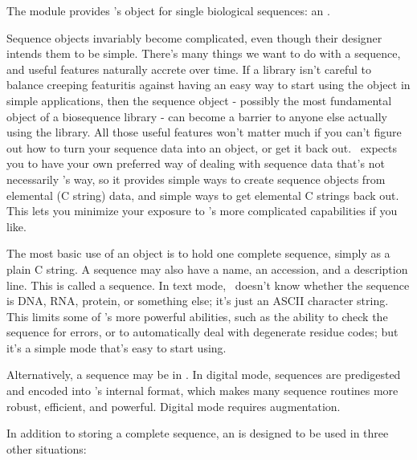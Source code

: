 The  module provides \Easel's object for single biological
sequences: an .

Sequence objects invariably become complicated, even though their
designer intends them to be simple. There's many things we want to do
with a sequence, and useful features naturally accrete over time. If a
library isn't careful to balance creeping featuritis against having an
easy way to start using the object in simple applications, then the
sequence object - possibly the most fundamental object of a
biosequence library - can become a barrier to anyone else actually
using the library. All those useful features won't matter much if you
can't figure out how to turn your sequence data into an object, or get
it back out. \Easel\ expects you to have your own preferred way of
dealing with sequence data that's not necessarily \Easel's way, so it
provides simple ways to create sequence objects from elemental (C
string) data, and simple ways to get elemental C strings back out.
This lets you minimize your exposure to \Easel's more complicated
capabilities if you like.

The most basic use of an  object is to hold one
complete sequence, simply as a plain C string. A sequence may also
have a name, an accession, and a description line.  This is called a
 sequence. In text mode, \Easel\ doesn't know
whether the sequence is DNA, RNA, protein, or something else; it's
just an ASCII character string. This limits some of \Easel's more
powerful abilities, such as the ability to check the sequence for
errors, or to automatically deal with degenerate residue codes; but
it's a simple mode that's easy to start using.

Alternatively, a sequence may be in . In digital
mode, sequences are predigested and encoded into \Easel's internal
format, which makes many sequence routines more robust, efficient, and
powerful. Digital mode requires  augmentation.

In addition to storing a complete sequence, an  is
designed to be used in three other situations:

